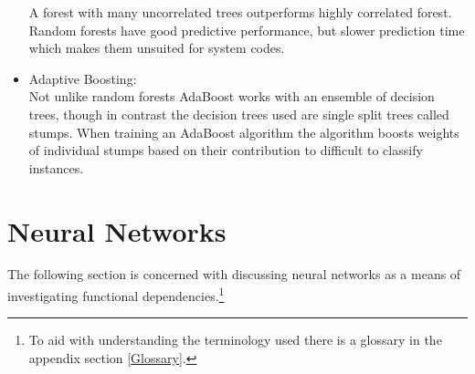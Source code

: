 \begin{itemize}
				A forest with many uncorrelated trees outperforms highly correlated forest. Random forests have good predictive performance, but slower prediction time which makes them unsuited for system codes.
		\item Adaptive Boosting:\\
			Not unlike random forests AdaBoost works with an ensemble of decision trees, though in contrast the decision trees used are single split trees called stumps. When training an AdaBoost algorithm the algorithm boosts weights of individual stumps based on their contribution to difficult to classify instances.
	\end{itemize}
	\section{Neural Networks}
		The following section is concerned with discussing neural networks as a means of investigating functional dependencies.\footnote{To aid with understanding the terminology used there is a glossary in the appendix section \ref{Glossary}.}\\		
